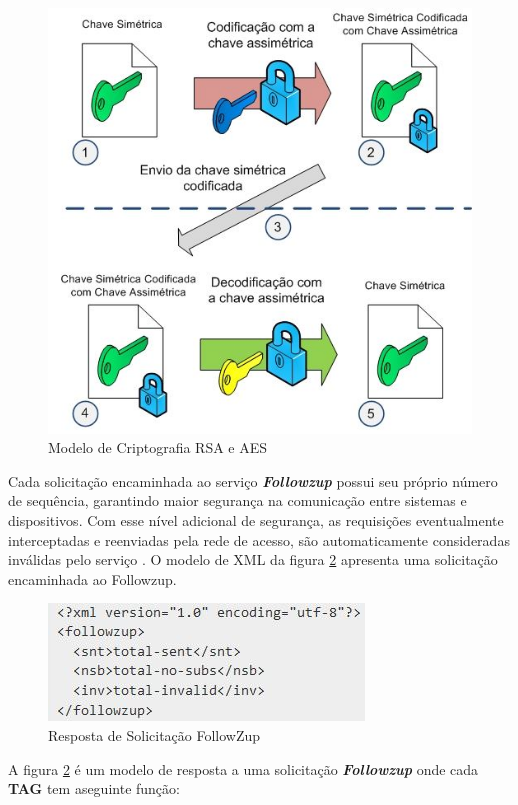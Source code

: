 \documentclass[12pt]{article}
\begin{document}
 \begin{figure}[H]
 \centering
	\includegraphics[scale=0.9]{jogoDeChaves.JPG}
	\caption{Modelo de Criptografia RSA e AES}
	\label{parDeCha}
\end{figure}


Cada solicitação encaminhada ao serviço \textit{\textbf{Followzup }}possui seu próprio número de sequência, garantindo maior segurança na comunicação entre sistemas e dispositivos. Com esse nível adicional de segurança, as requisições eventualmente interceptadas e reenviadas pela rede de acesso, são automaticamente consideradas inválidas pelo serviço \cite{followzup}. O modelo de XML da figura \ref{xml} apresenta uma solicitação encaminhada ao Followzup.

 \begin{figure}[H]
 \centering
	\includegraphics[scale=1]{xml}
	\caption{Resposta de Solicitação FollowZup}
	\label{xml}
\end{figure}

A figura \ref{xml} é um modelo de resposta a uma solicitação \textit{\textbf{Followzup }}onde cada \textbf{TAG} tem aseguinte função:
\end{document}
